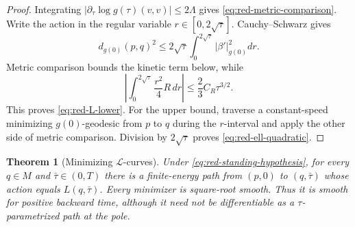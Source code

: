 \documentclass[10pt]{coll-l}
\newtheorem{theorem}{Theorem}[chapter]
\theoremstyle{definition}
\theoremstyle{remark}
\numberwithin{section}{chapter}
\numberwithin{equation}{chapter}
\begin{document}
\begin{proof}
Integrating
$|\partial_\tau\log g(\tau)(v,v)|\leq2\Lambda$ gives
\eqref{eq:red-metric-comparison}.  Write the action in the regular variable
$r\in[0,2\sqrt\tau]$.  Cauchy--Schwarz gives
\begin{equation}
 d_{g(0)}(p,q)^2\leq2\sqrt\tau
       \int_0^{2\sqrt\tau}|\beta'|_{g(0)}^2dr.          \label{eq:red-energy-distance}
\end{equation}
Metric comparison bounds the kinetic term below, while
\begin{equation}
 \left|\int_0^{2\sqrt\tau}\frac{r^2}{4}R\,dr\right|
       \leq\frac23C_R\tau^{3/2}.                       \label{eq:red-potential-bound}
\end{equation}
This proves \eqref{eq:red-L-lower}.  For the upper bound, traverse a
constant-speed minimizing $g(0)$-geodesic from $p$ to $q$ during the
$r$-interval and apply the other side of metric comparison.  Division by
$2\sqrt\tau$ proves \eqref{eq:red-ell-quadratic}.
\end{proof}

\begin{theorem}[Minimizing $\mathcal L$-curves]
\label{thm:red-minimizer-existence}
Under \eqref{eq:red-standing-hypothesis}, for every $q\in M$ and
$\bar\tau\in(0,T)$ there is a finite-energy path from $(p,0)$ to
$(q,\bar\tau)$ whose action equals $L(q,\bar\tau)$.  Every minimizer is
square-root smooth.  Thus it is smooth for positive backward time, although
it need not be differentiable as a $\tau$-parametrized path at the pole.
\end{theorem}
\end{document}
